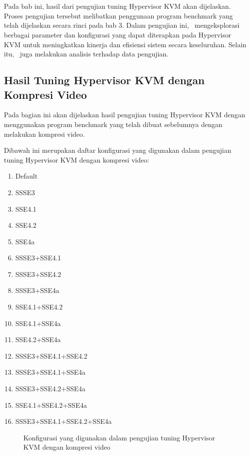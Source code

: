 \chapter{\babEmpat}
Pada bab ini, hasil dari pengujian tuning Hypervisor KVM akan dijelaskan. Proses pengujian tersebut melibatkan penggunaan program benchmark yang telah dijelaskan secara rinci pada bab 3. Dalam pengujian ini, \saya\ mengeksplorasi berbagai parameter dan konfigurasi yang dapat diterapkan pada Hypervisor KVM untuk meningkatkan kinerja dan efisiensi sistem secara keseluruhan. Selain itu, \saya\ juga melakukan analisis terhadap data pengujian.

\section{Hasil Tuning Hypervisor KVM dengan Kompresi Video}
Pada bagian ini akan dijelaskan hasil pengujian tuning Hypervisor KVM dengan menggunakan program benchmark yang telah dibuat sebelumnya dengan melakukan kompresi video.

Dibawah ini merupakan daftar konfigurasi yang digunakan dalam pengujian tuning Hypervisor KVM dengan kompresi video:

\begin{multicols}{2}
    \begin{enumerate}
        \item Default
        \item SSSE3
        \item SSE4.1
        \item SSE4.2
        \item SSE4a
        \item SSSE3+SSE4.1
        \item SSSE3+SSE4.2
        \item SSSE3+SSE4a
        \item SSE4.1+SSE4.2
        \item SSE4.1+SSE4a
        \item SSE4.2+SSE4a
        \item SSSE3+SSE4.1+SSE4.2
        \item SSSE3+SSE4.1+SSE4a
        \item SSSE3+SSE4.2+SSE4a
        \item SSE4.1+SSE4.2+SSE4a
        \item SSSE3+SSE4.1+SSE4.2+SSE4a
    \end{enumerate}
\end{multicols}
\begin{figure}
    \centering
    \caption{Konfigurasi yang digunakan dalam pengujian tuning Hypervisor KVM dengan kompresi video}
    \label{fig:video_compression_test_configuration}
\end{figure}

